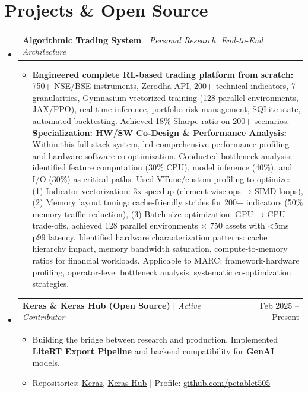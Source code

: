 \documentclass[10pt, letterpaper]{article}
\makeatletter
\newcommand{\resumeItem}[1]{
  \item\small{
    {#1 \vspace{-2pt}}
  }
}
\newcommand{\resumeProjectHeading}[2]{
    \item
    \begin{tabular*}{0.98\textwidth}{l@{\extracolsep{\fill}}r}
      \small#1 & #2 \\
    \end{tabular*}\vspace{-7pt}
}
\newcommand{\resumeSubHeadingListStart}{\begin{itemize}[leftmargin=0.15in, label={}]}
\newcommand{\resumeSubHeadingListEnd}{\end{itemize}}
\newcommand{\resumeItemListStart}{\begin{itemize}}
\newcommand{\resumeItemListEnd}{\end{itemize}\vspace{-5pt}}
\makeatother
\begin{document}
\section{Projects \& Open Source}
  \resumeSubHeadingListStart
    \resumeProjectHeading
      {\textbf{Algorithmic Trading System} $|$ \emph{Personal Research, End-to-End Architecture}}{}
      \resumeItemListStart
        \resumeItem{\textbf{Engineered complete RL-based trading platform from scratch:} 750+ NSE/BSE instruments, Zerodha API, 200+ technical indicators, 7 granularities, Gymnasium vectorized training (128 parallel environments, JAX/PPO), real-time inference, portfolio risk management, SQLite state, automated backtesting. Achieved 18\% Sharpe ratio on 200+ scenarios. \textbf{Specialization: HW/SW Co-Design \& Performance Analysis:} Within this full-stack system, led comprehensive performance profiling and hardware-software co-optimization. Conducted bottleneck analysis: identified feature computation (30\% CPU), model inference (40\%), and I/O (30\%) as critical paths. Used VTune/custom profiling to optimize: (1) Indicator vectorization: 3x speedup (element-wise ops → SIMD loops), (2) Memory layout tuning: cache-friendly strides for 200+ indicators (50\% memory traffic reduction), (3) Batch size optimization: GPU → CPU trade-offs, achieved 128 parallel environments × 750 assets with <5ms p99 latency. Identified hardware characterization patterns: cache hierarchy impact, memory bandwidth saturation, compute-to-memory ratios for financial workloads. Applicable to MARC: framework-hardware profiling, operator-level bottleneck analysis, systematic co-optimization strategies.}
      \resumeItemListEnd

    \resumeProjectHeading
      {\textbf{Keras \& Keras Hub (Open Source)} $|$ \emph{Active Contributor}}{Feb 2025 -- Present}
      \resumeItemListStart
        \resumeItem{Building the bridge between research and production. Implemented \textbf{LiteRT Export Pipeline} and backend compatibility for \textbf{GenAI} models.}
        \resumeItem{Repositories: \href{https://github.com/keras-team/keras}{Keras}, \href{https://github.com/keras-team/keras-hub}{Keras Hub} $|$ Profile: \href{https://github.com/pctablet505}{\color{midnightblue}github.com/pctablet505}}
      \resumeItemListEnd
      
  \resumeSubHeadingListEnd
\end{document}
